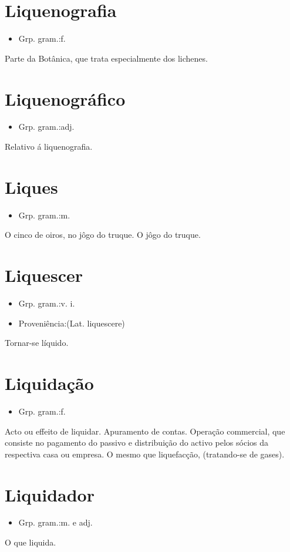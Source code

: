 \section{Liquenografia}
\begin{itemize}
\item {Grp. gram.:f.}
\end{itemize}
Parte da Botânica, que trata especialmente dos lichenes.
\section{Liquenográfico}
\begin{itemize}
\item {Grp. gram.:adj.}
\end{itemize}
Relativo á liquenografia.
\section{Liques}
\begin{itemize}
\item {Grp. gram.:m.}
\end{itemize}
O cinco de oiros, no jôgo do truque.
O jôgo do truque.
\section{Liquescer}
\begin{itemize}
\item {Grp. gram.:v. i.}
\end{itemize}
\begin{itemize}
\item {Proveniência:(Lat. \textunderscore liquescere\textunderscore )}
\end{itemize}
Tornar-se líquido.
\section{Liquidação}
\begin{itemize}
\item {Grp. gram.:f.}
\end{itemize}
Acto ou effeito de liquidar.
Apuramento de contas.
Operação commercial, que consiste no pagamento do passivo e distribuição do activo pelos sócios da respectiva casa ou empresa.
O mesmo que \textunderscore liquefacção\textunderscore , (tratando-se de gases).
\section{Liquidador}
\begin{itemize}
\item {Grp. gram.:m.  e  adj.}
\end{itemize}
O que liquida.
